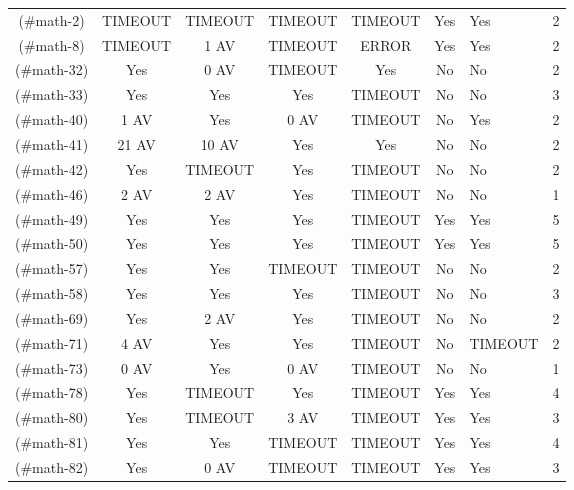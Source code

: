 \begin{table}[!t]
{\begin{tabular}{|c|c|c|c|c|c|}
\hline
[M2](#math-2)     & TIMEOUT   & TIMEOUT   & TIMEOUT   & TIMEOUT   & Yes       & Yes       &      2 \\
[M8](#math-8)     & TIMEOUT   & 1 AV      & TIMEOUT   & ERROR     & Yes       & Yes       &      2 \\
[M32](#math-32)   & Yes       & 0 AV      & TIMEOUT   & Yes       & No        & No        &      2 \\
[M33](#math-33)   & Yes       & Yes       & Yes       & TIMEOUT   & No        & No        &      3 \\
[M40](#math-40)   & 1 AV      & Yes       & 0 AV      & TIMEOUT   & No        & Yes       &      2 \\
[M41](#math-41)   & 21 AV     & 10 AV     & Yes       & Yes       & No        & No        &      2 \\
[M42](#math-42)   & Yes       & TIMEOUT   & Yes       & TIMEOUT   & No        & No        &      2 \\
[M46](#math-46)   & 2 AV      & 2 AV      & Yes       & TIMEOUT   & No        & No        &      1 \\
[M49](#math-49)   & Yes       & Yes       & Yes       & TIMEOUT   & Yes       & Yes       &      5 \\
[M50](#math-50)   & Yes       & Yes       & Yes       & TIMEOUT   & Yes       & Yes       &      5 \\
[M57](#math-57)   & Yes       & Yes       & TIMEOUT   & TIMEOUT   & No        & No        &      2 \\
[M58](#math-58)   & Yes       & Yes       & Yes       & TIMEOUT   & No        & No        &      3 \\
[M69](#math-69)   & Yes       & 2 AV      & Yes       & TIMEOUT   & No        & No        &      2 \\
[M71](#math-71)   & 4 AV      & Yes       & Yes       & TIMEOUT   & No        & TIMEOUT   &      2 \\
[M73](#math-73)   & 0 AV      & Yes       & 0 AV      & TIMEOUT   & No        & No        &      1 \\
[M78](#math-78)   & Yes       & TIMEOUT   & Yes       & TIMEOUT   & Yes       & Yes       &      4 \\
[M80](#math-80)   & Yes       & TIMEOUT   & 3 AV      & TIMEOUT   & Yes       & Yes       &      3 \\
[M81](#math-81)   & Yes       & Yes       & TIMEOUT   & TIMEOUT   & Yes       & Yes       &      4 \\
[M82](#math-82)   & Yes       & 0 AV      & TIMEOUT   & TIMEOUT   & Yes       & Yes       &      3 \\

\end{tabular}}
\end{table}
